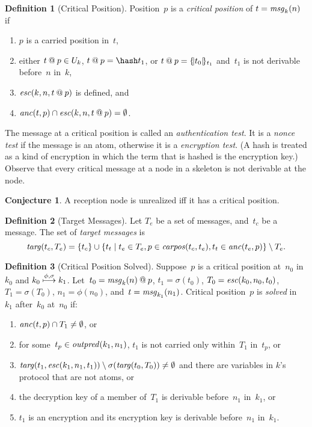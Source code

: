 \documentclass[12pt]{report}
\theoremstyle{definition}
\newtheorem{defn}{Definition}[chapter]
\newtheorem{conj}[thm]{Conjecture}
\newcommand{\outpred}{\fn{outpred}}
\newcommand{\msg}{\fn{msg}}
\begin{document}
\begin{defn}[Critical Position]\label{def:critical position}
Position~$p$ is a \emph{critical position} of
$t=\msg_k(n)$ if
\begin{enumerate}
\item $p$ is a carried position in~$t$,
\item either $t\mathbin{@} p\in U_k$, $t\termat p=\hash t_1$, or $t\mathbin{@}
  p=\{\!|t_0|\!\}_{t_1}$ and~$t_1$ is not derivable before~$n$ in~$k$,
  \label{item:nonce or encryption}
\item $\operatorname{\mathit{esc}}(k,n,t\mathbin{@} p)$ is defined, and
\item $\operatorname{\mathit{anc}}(t,p)\cap \operatorname{\mathit{esc}}(k,n,t\mathbin{@} p)=\emptyset$.
\end{enumerate}
\end{defn}

The message at a critical position is called an \emph{authentication
  test}.  It is a \emph{nonce test} if the message
is an atom, otherwise it is a \emph{encryption
  test}.  (A hash is treated as a kind of encryption in
which the term that is hashed is the encryption key.)  Observe that
every critical message at a node in a skeleton is not derivable at the
node.

\begin{conj}
A reception node is unrealized iff it has a critical position.
\end{conj}

\begin{defn}[Target Messages]
Let $T_e$ be a set of messages, and~$t_c$ be a message.  The set of
\emph{target messages} is
$$\operatorname{\mathit{targ}}(t_c,T_e)=\{t_c\}\cup\{t_t\mid t_e\in T_e,p\in\operatorname{\mathit{carpos}}(t_c, t_e),
t_t\in\operatorname{\mathit{anc}}(t_e,p)\}\setminus T_e.$$
\end{defn}

\begin{defn}[Critical Position Solved]\label{def:critical position solved}
Suppose~$p$ is a critical position at~$n_0$ in~$k_0$ and
$k_0\stackrel{\phi,\sigma}{\longmapsto}k_1$.  Let~$t_0=\msg_k(n)\termat p$,
$t_1=\sigma(t_0)$, $T_0=\operatorname{\mathit{esc}}(k_0,n_0,t_0)$, $T_1=\sigma(T_0)$,
$n_1=\phi(n_0)$, and~$t=\msg_{k_1}(n_1)$.  Critical position~$p$ is
\emph{solved} in~$k_1$ after~$k_0$
at~$n_0$ if:
\begin{enumerate}
\item $\operatorname{\mathit{anc}}(t,p)\cap T_1\neq\emptyset$, or
\item for some~$t_p\in\outpred(k_1,n_1)$, $t_1$ is not carried
  only within~$T_1$ in~$t_p$, or
\item
  $\operatorname{\mathit{targ}}(t_1,\operatorname{\mathit{esc}}(k_1,n_1,t_1))\setminus\sigma(\operatorname{\mathit{targ}}(t_0,T_0))\neq\emptyset$
  and there are variables in $k$'s protocol that are not atoms, or
\item the decryption key of a member of~$T_1$ is derivable
  before~$n_1$ in~$k_1$, or
\item $t_1$ is an encryption and its encryption key is derivable
  before~$n_1$ in~$k_1$.
\end{enumerate}
\end{defn}
\end{document}
